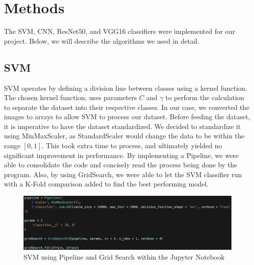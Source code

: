 \graphicspath{ {project_images/} }

\section{Methods}

The SVM, CNN, ResNet50, and VGG16 classifiers were implemented for our project.
Below, we will describe the algorithms we used in detail.

\subsection{SVM}
SVM operates by defining a division line between classes using a kernel function. 
The chosen kernel function, uses parameters $C$ and $\gamma$ to perform the calculation to separate the dataset into their respective classes.
In our case, we converted the images to arrays to allow SVM to process our dataset.
Before feeding the dataset, it is imperative to have the dataset standardized.
We decided to standardize it using MinMaxScaler, as StandardScaler would change the data to be within the range $[0,1]$.
This took extra time to process, and ultimately yielded no significant improvement in performance.
By implementing a Pipeline, we were able to consolidate the code and concisely read the process being done by the program.
Also, by using GridSearch, we were able to let the SVM classifier run with a K-Fold comparison added to find the best performing model.

\begin{figure}[h]
	\centering
	\includegraphics[scale=0.5]{SVM_explained.png}
	\caption{SVM using Pipeline and Grid Search within the Jupyter Notebook}
	\label{fig:figure1}
\end{figure}


